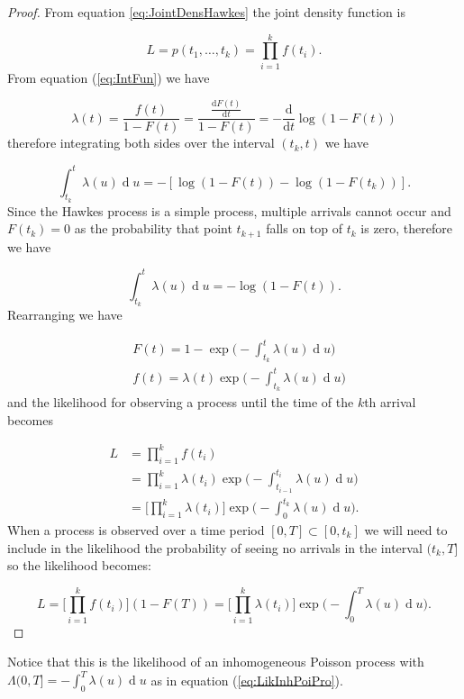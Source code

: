 \documentclass[11pt,a4paper]{article}
\renewcommand{\d}[1]{\ensuremath{\operatorname{d}\!{#1}}}
\begin{document}
\begin{proof}
    From equation \ref{eq:JointDensHawkes} the joint density function is
    
    \begin{equation*}
        L = p(t_1, \dots, t_k) = \prod_{i = 1}^k f(t_i).
    \end{equation*}
    From equation (\ref{eq:IntFun}) we have
    
    \begin{equation*}
        \lambda(t) = \frac{f(t)}{1 - F(t)} = \frac{\frac{\mathrm{d} F(t)}{\mathrm{d} t}}{1 - F(t)} = - \frac{\mathrm{d}}{\mathrm{d} t} \log(1 - F(t))
    \end{equation*}
    therefore integrating both sides over the interval $(t_k, t)$ we have
    
    \begin{equation*}
        \int_{t_k}^t \lambda (u) \d u = - [\log(1 - F(t)) - \log(1 - F(t_k))].
    \end{equation*}
    Since the Hawkes process is a simple process, multiple arrivals cannot occur and $F(t_k) = 0$ as the probability that point $t_{k+1}$ falls on top of $t_k$ is zero, therefore we have
    
    \begin{equation}\label{logCDF}
        \int_{t_k}^t \lambda (u) \d u = - \log(1 - F(t)).
    \end{equation}
    Rearranging we have
    
    \begin{align*}
        & F(t) = 1 - \exp \Bigg( -\int_{t_k}^t \lambda(u) \d u \Bigg) \\
        & f(t) = \lambda(t) \exp \Bigg( -\int_{t_k}^t \lambda(u) \d u \Bigg)
    \end{align*}
    and the likelihood for observing a process until the time of the $k$th arrival becomes
    
    \begin{align*}
        L &= \prod_{i=1}^k f(t_i) \\
        &= \prod_{i=1}^k \lambda(t_i) \exp \Bigg( -\int_{t_{i-1}}^{t_i} \lambda(u) \d u \Bigg) \\
        &= \Bigg[ \prod_{i=1}^k \lambda(t_i) \Bigg]\exp \Bigg( -\int_{0}^{t_k} \lambda(u) \d u \Bigg).
    \end{align*}
    When a process is observed over a time period $[0, T] \subset [0, t_k]$ we will need to include in the likelihood the probability of seeing no arrivals in the interval $(t_k, T]$ so the likelihood becomes:
    
    \begin{equation*}
        L = \Bigg[ \prod_{i=1}^k f(t_i) \Bigg] (1 - F(T)) = \Bigg[ \prod_{i=1}^k \lambda(t_i) \Bigg]\exp \Bigg( -\int_{0}^{T} \lambda(u) \d u \Bigg).
    \end{equation*}
\end{proof}
Notice that this is the likelihood of an inhomogeneous Poisson process with $\Lambda(0, T] = -\int_{0}^T \lambda(u) \d u$ as in equation (\ref{eq:LikInhPoiPro}).
\end{document}

